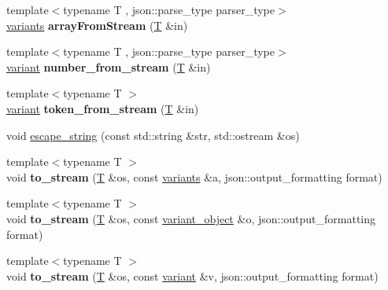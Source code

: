 \begin{DoxyCompactItemize}
{\footnotesize template$<$typename T , json\+::parse\+\_\+type parser\+\_\+type$>$ }\\\mbox{\hyperlink{classstd_1_1vector}{variants}} {\bfseries array\+From\+Stream} (\mbox{\hyperlink{struct_t}{T}} \&in)
\item 
\mbox{\label{namespacefc_a1a45bd4f160e97bde0e5460fd2984da6}} 
{\footnotesize template$<$typename T , json\+::parse\+\_\+type parser\+\_\+type$>$ }\\\mbox{\hyperlink{classfc_1_1variant}{variant}} {\bfseries number\+\_\+from\+\_\+stream} (\mbox{\hyperlink{struct_t}{T}} \&in)
\item 
\mbox{\label{namespacefc_ab330b9b42588c2bf0021cf177ee49ca6}} 
{\footnotesize template$<$typename T $>$ }\\\mbox{\hyperlink{classfc_1_1variant}{variant}} {\bfseries token\+\_\+from\+\_\+stream} (\mbox{\hyperlink{struct_t}{T}} \&in)
\item 
void \mbox{\hyperlink{namespacefc_a37a488b71b961b892adf844354d23c07}{escape\+\_\+string}} (const std\+::string \&str, std\+::ostream \&os)
\item 
\mbox{\label{namespacefc_abfcb8583b5be6941298474aae842a1b2}} 
{\footnotesize template$<$typename T $>$ }\\void {\bfseries to\+\_\+stream} (\mbox{\hyperlink{struct_t}{T}} \&os, const \mbox{\hyperlink{classstd_1_1vector}{variants}} \&a, json\+::output\+\_\+formatting format)
\item 
\mbox{\label{namespacefc_a48fdf4b02cceac1723e44502e58b1841}} 
{\footnotesize template$<$typename T $>$ }\\void {\bfseries to\+\_\+stream} (\mbox{\hyperlink{struct_t}{T}} \&os, const \mbox{\hyperlink{classfc_1_1variant__object}{variant\+\_\+object}} \&o, json\+::output\+\_\+formatting format)
\item 
\mbox{\label{namespacefc_a7c76abdcbe0bf34f6dcc5ece5d59aea4}} 
{\footnotesize template$<$typename T $>$ }\\void {\bfseries to\+\_\+stream} (\mbox{\hyperlink{struct_t}{T}} \&os, const \mbox{\hyperlink{classfc_1_1variant}{variant}} \&v, json\+::output\+\_\+formatting format)
\item 
\mbox{\label{namespacefc_ac11f6266177ed5f42e899ccc37550181}} 

\end{DoxyCompactItemize}
